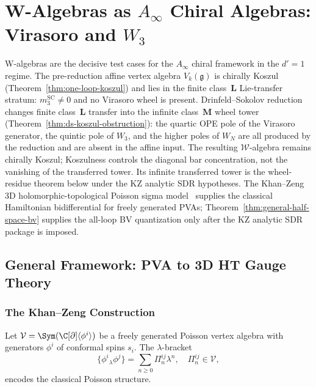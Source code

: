 \section{W-Algebras as $A_\infty$ Chiral Algebras: Virasoro and $W_3$}

W-algebras are the decisive test cases for the $A_\infty$ chiral framework in the $d' = 1$ regime. The pre-reduction affine vertex algebra $V_k(\mathfrak{g})$ is chirally Koszul (Theorem~\ref{thm:one-loop-koszul}) and lies in the finite class~$\mathbf{L}$ Lie-transfer stratum: $m_3^{\mathrm{SC}} \neq 0$ and no Virasoro wheel is present. Drinfeld--Sokolov reduction changes finite class~$\mathbf{L}$ transfer into the infinite class~$\mathbf{M}$ wheel tower (Theorem~\ref{thm:ds-koszul-obstruction}): the quartic OPE pole of the Virasoro generator, the quintic pole of $W_3$, and the higher poles of $W_N$ are all produced by the reduction and are absent in the affine input. The resulting $\mathcal{W}$-algebra remains chirally Koszul; Koszulness controls the diagonal bar concentration, not the vanishing of the transferred tower. Its infinite transferred tower is the wheel-residue theorem below under the KZ analytic SDR hypotheses. The Khan--Zeng 3D holomorphic-topological Poisson sigma model~\cite{KZ25} supplies the classical Hamiltonian bidifferential for freely generated PVAs; Theorem~\ref{thm:general-half-space-bv} supplies the all-loop BV quantization only after the KZ analytic SDR package is imposed.

\subsection{General Framework: PVA to 3D HT Gauge Theory}

\subsubsection{The Khan--Zeng Construction}

Let $\mathcal{V} = \Sym(\C[\partial]\langle \phi^i \rangle)$ be a freely generated Poisson vertex algebra with generators $\phi^i$ of conformal spins $s_i$. The $\lambda$-bracket
\[
\{\phi^i{}_\lambda \phi^j\} = \sum_{n \geq 0} \Pi^{ij}_n \lambda^n, \quad \Pi^{ij}_n \in \mathcal{V},
\]
encodes the classical Poisson structure.


